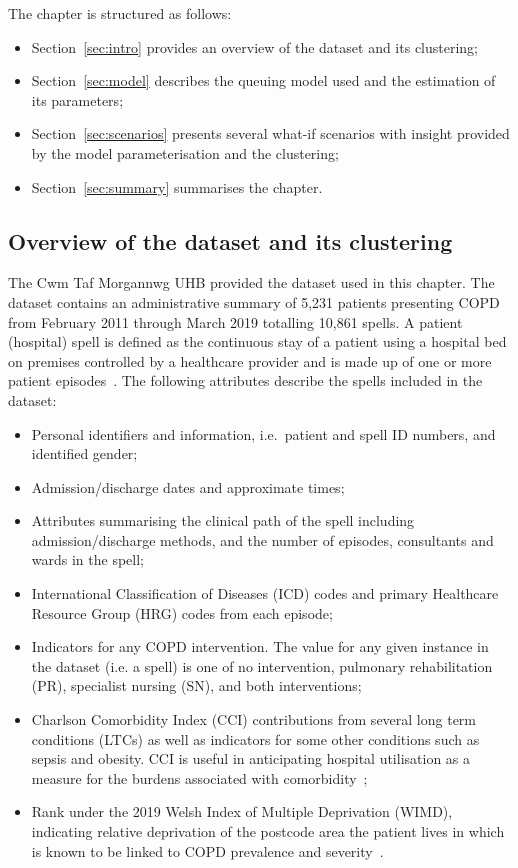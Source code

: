 The chapter is structured as follows:

\begin{itemize}
    \item Section~\ref{sec:intro} provides an overview of the dataset and its
        clustering;
    \item Section~\ref{sec:model} describes the queuing model used and the
        estimation of its parameters;
    \item Section~\ref{sec:scenarios} presents several what-if scenarios with
        insight provided by the model parameterisation and the clustering;
    \item Section~\ref{sec:summary} summarises the chapter.
\end{itemize}


\subsection{Overview of the dataset and its clustering}\label{subsec:overview}

The Cwm Taf Morgannwg UHB provided the dataset used in this chapter. The
dataset contains an administrative summary of 5,231 patients presenting COPD
from February 2011 through March 2019 totalling 10,861 spells. A patient
(hospital) spell is defined as the continuous stay of a patient using a hospital
bed on premises controlled by a healthcare provider and is made up of one or
more patient episodes~\cite{NHS2020}. The following attributes describe the
spells included in the dataset:

\begin{itemize}
    \item Personal identifiers and information, i.e.\ patient and spell ID
        numbers, and identified gender;
    \item Admission/discharge dates and approximate times;
    \item Attributes summarising the clinical path of the spell including
        admission/discharge methods, and the number of episodes, consultants and
        wards in the spell;
    \item International Classification of Diseases (ICD) codes and primary
        Healthcare Resource Group (HRG) codes from each episode;
    \item Indicators for any COPD intervention. The value for any given instance
        in the dataset (i.e. a spell) is one of no intervention, pulmonary
        rehabilitation (PR), specialist nursing (SN), and both interventions;
    \item Charlson Comorbidity Index (CCI) contributions from several long term
        conditions (LTCs) as well as indicators for some other conditions such
        as sepsis and obesity. CCI is useful in anticipating hospital
        utilisation as a measure for the burdens associated with
        comorbidity~\cite{Simon2011};
    \item Rank under the 2019 Welsh Index of Multiple Deprivation (WIMD),
        indicating relative deprivation of the postcode area the patient lives
        in which is known to be linked to COPD prevalence and
        severity~\cite{Collins2018,Sexton2016,Steiner2017}.
\end{itemize}

